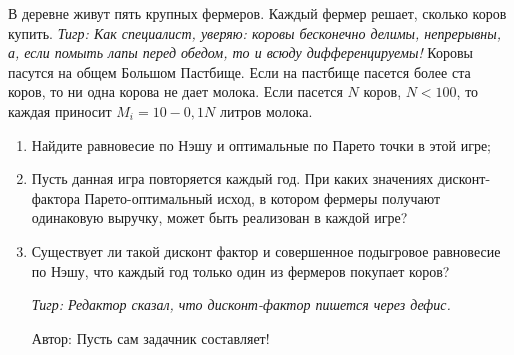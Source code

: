 \begin{problem}[Коровы]
В деревне живут пять крупных фермеров. Каждый фермер решает, сколько коров купить. {\it Тигр: Как специалист, уверяю: коровы  бесконечно делимы, непрерывны, а, если помыть лапы перед обедом, то и  всюду дифференцируемы!} Коровы пасутся на общем Большом Пастбище. Если на пастбище пасется более ста коров, то ни одна корова не дает молока. Если пасется  $N$  коров,  $N<100$, то каждая приносит  $M_{i} =10-0,1N$  литров молока.\par
\begin{enumerate}
\item Найдите равновесие по Нэшу и оптимальные по Парето точки в этой игре;\par
\item Пусть данная игра повторяется каждый год. При каких значениях дисконт-фактора Парето-оптимальный исход, в котором фермеры получают одинаковую выручку, может быть реализован в каждой игре?\par
\item  Существует ли такой дисконт фактор и совершенное подыгровое равновесие по Нэшу, что каждый год только один из фермеров покупает коров?\par
{\it Тигр: Редактор сказал, что дисконт-фактор пишется через дефис.}\par
Автор: Пусть сам задачник составляет!
\end{enumerate}


\begin{sol}

\end{sol}
\end{problem}



